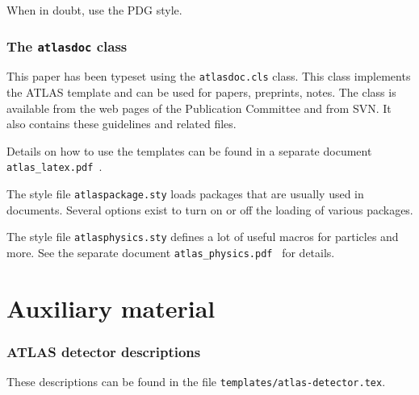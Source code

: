\documentclass[PAPER,UKenglish,texlive=2016]{\ATLASLATEXPATH atlasdoc}
\newcommand{\File}[1]{\texttt{#1}\xspace}
\begin{document}
When in doubt, use the PDG style.


\section{The \texttt{atlasdoc} class}
\label{sec:atlasdoc}

This paper has been typeset using the \texttt{atlasdoc.cls} class.
This class implements the ATLAS template and can be used for papers, preprints,
notes. The class is available from the web pages of the
Publication Committee and from SVN.
It also contains these guidelines and related files.

Details on how to use the templates can be found in a separate document
\texttt{atlas\_latex.pdf}~\cite{atlas-latex}.

The style file \File{atlaspackage.sty} loads packages that are usually used in documents.
Several options exist to turn on or off the loading of various packages.

The style file \texttt{atlasphysics.sty} defines a lot of useful
macros for particles and more. See the separate document
\texttt{atlas\_physics.pdf}~\cite{atlas-physics} for details.


\printbibliography
% 
% 


\clearpage
\appendix
\part*{Auxiliary material}


\section{ATLAS detector descriptions}
\label{app:atlasdet}

These descriptions can be found in the file \File{templates/atlas-detector.tex}.


\end{document}
